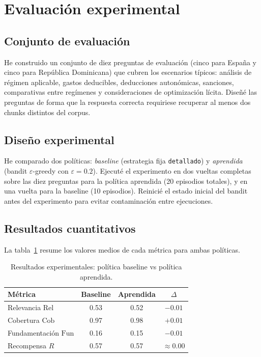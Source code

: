 \documentclass[11pt,a4paper]{article}
\begin{document}
\section{Evaluación experimental}\label{sec:evaluacion}

\subsection{Conjunto de evaluación}

He construido un conjunto de diez preguntas de evaluación (cinco para España y cinco para República Dominicana) que cubren los escenarios típicos: análisis de régimen aplicable, gastos deducibles, deducciones autonómicas, sanciones, comparativas entre regímenes y consideraciones de optimización lícita. Diseñé las preguntas de forma que la respuesta correcta requiriese recuperar al menos dos chunks distintos del corpus.

\subsection{Diseño experimental}

He comparado dos políticas: \emph{baseline} (estrategia fija \texttt{detallado}) y \emph{aprendida} (bandit $\varepsilon$-greedy con $\varepsilon = 0.2$). Ejecuté el experimento en dos vueltas completas sobre las diez preguntas para la política aprendida (20 episodios totales), y en una vuelta para la baseline (10 episodios). Reinicié el estado inicial del bandit antes del experimento para evitar contaminación entre ejecuciones.

\subsection{Resultados cuantitativos}

La tabla~\ref{tab:resultados} resume los valores medios de cada métrica para ambas políticas.

\begin{table}[H]
\centering
\caption{Resultados experimentales: política baseline vs política aprendida.}
\label{tab:resultados}
\begin{tabular}{lccc}
\toprule
\textbf{Métrica}     & \textbf{Baseline} & \textbf{Aprendida} & \textbf{$\Delta$} \\
\midrule
Relevancia $\mathrm{Rel}$        & 0.53 & 0.52 & $-0.01$ \\
Cobertura $\mathrm{Cob}$         & 0.97 & 0.98 & $+0.01$ \\
Fundamentación $\mathrm{Fun}$    & 0.16 & 0.15 & $-0.01$ \\
\midrule
Recompensa $R$ & 0.57 & 0.57 & $\approx 0.00$ \\
\bottomrule
\end{tabular}
\end{table}
\end{document}
